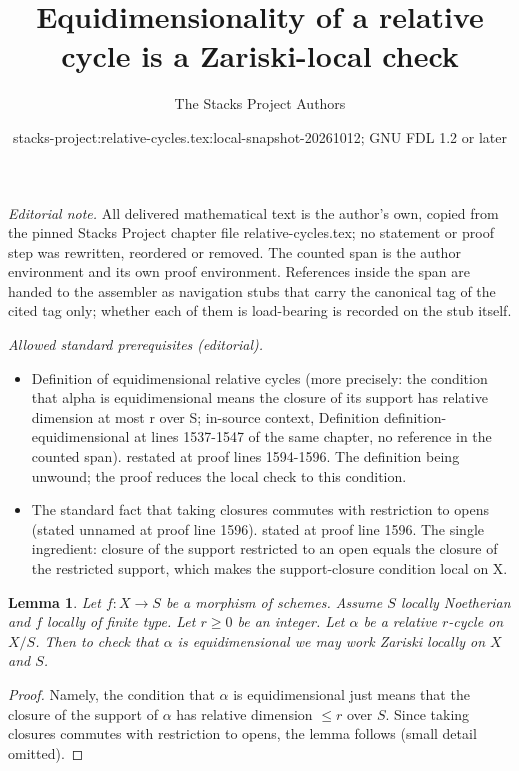 \documentclass{stacks-project}
\title{Equidimensionality of a relative cycle is a Zariski-local check}
\author{The Stacks Project Authors}
\date{stacks-project:relative-cycles.tex:local-snapshot-20261012; GNU FDL 1.2 or later}
\theoremstyle{plain}
\newtheorem{lemma}[subsection]{Lemma}
\theoremstyle{definition}
\theoremstyle{remark}
\numberwithin{equation}{subsection}
\begin{document}
\maketitle
\setcounter{subsection}{1}
\noindent\textit{Editorial note.} All delivered mathematical text is the author's own, copied from the pinned Stacks Project chapter file relative-cycles.tex; no statement or proof step was rewritten, reordered or removed. The counted span is the author environment and its own proof environment. References inside the span are handed to the assembler as navigation stubs that carry the canonical tag of the cited tag only; whether each of them is load-bearing is recorded on the stub itself.\par\medskip
\noindent\textit{Allowed standard prerequisites (editorial).}\begin{itemize}
\item Definition of equidimensional relative cycles (more precisely: the condition that alpha is equidimensional means the closure of its support has relative dimension at most r over S; in-source context, Definition definition-equidimensional at lines 1537-1547 of the same chapter, no reference in the counted span). restated at proof lines 1594-1596. The definition being unwound; the proof reduces the local check to this condition.
\item The standard fact that taking closures commutes with restriction to opens (stated unnamed at proof line 1596). stated at proof line 1596. The single ingredient: closure of the support restricted to an open equals the closure of the restricted support, which makes the support-closure condition local on X.
\end{itemize}\medskip
\begin{lemma}
\label{lemma-check-equidimensional}
Let $f : X \to S$ be a morphism of schemes. Assume $S$ locally Noetherian
and $f$ locally of finite type. Let $r \geq 0$ be an integer. Let $\alpha$
be a relative $r$-cycle on $X/S$. Then to check that $\alpha$ is equidimensional
we may work Zariski locally on $X$ and $S$.
\end{lemma}

\begin{proof}
Namely, the condition that $\alpha$ is equidimensional just means that
the closure of the support of $\alpha$ has relative dimension $\leq r$
over $S$. Since taking closures commutes with restriction to opens,
the lemma follows (small detail omitted).
\end{proof}
\end{document}
